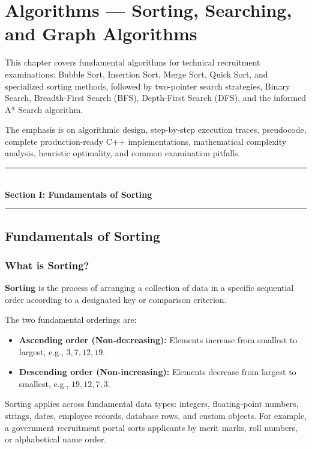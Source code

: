 \chapter{Algorithms --- Sorting, Searching, and Graph Algorithms}
\label{ch:algorithms}

This chapter covers fundamental algorithms for technical recruitment examinations: Bubble Sort, Insertion Sort, Merge Sort, Quick Sort, and specialized sorting methods, followed by two-pointer search strategies, Binary Search, Breadth-First Search (BFS), Depth-First Search (DFS), and the informed A* Search algorithm.

The emphasis is on algorithmic design, step-by-step execution traces, pseudocode, complete production-ready C++ implementations, mathematical complexity analysis, heuristic optimality, and common examination pitfalls.

\begin{center}
\vspace{0.5em}
{\color{primary}\rule{0.45\textwidth}{1.2pt}}\\[4pt]
{\Large\bfseries\color{primary} Section I: Fundamentals of Sorting}\\[2pt]
{\color{primary}\rule{0.45\textwidth}{1.2pt}}
\vspace{0.5em}
\end{center}

\section{Fundamentals of Sorting}

\subsection{What is Sorting?}

\textbf{Sorting} is the process of arranging a collection of data in a specific sequential order according to a designated key or comparison criterion.

The two fundamental orderings are:
\begin{itemize}
    \item \textbf{Ascending order (Non-decreasing):} Elements increase from smallest to largest, e.g., $3, 7, 12, 19$.
    \item \textbf{Descending order (Non-increasing):} Elements decrease from largest to smallest, e.g., $19, 12, 7, 3$.
\end{itemize}

Sorting applies across fundamental data types: integers, floating-point numbers, strings, dates, employee records, database rows, and custom objects. For example, a government recruitment portal sorts applicants by merit marks, roll numbers, or alphabetical name order.

